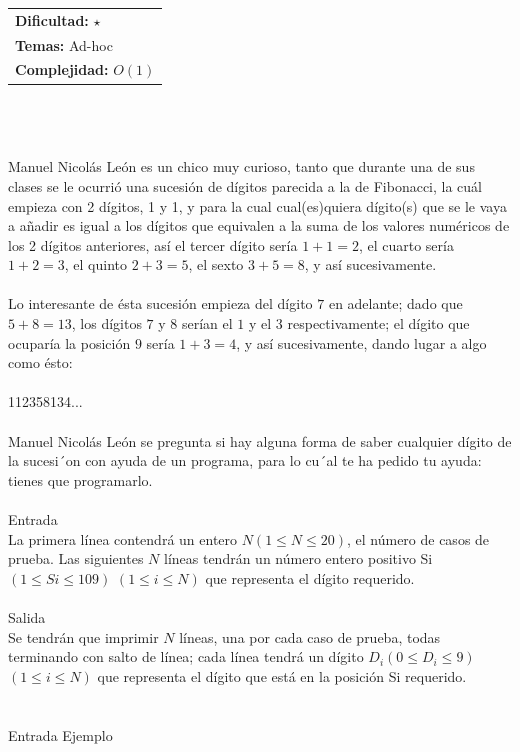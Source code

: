\documentclass[12pt]{article}
\begin{document}
\hfill
\begin{tabular}{@{}l@{}}
\textbf{Dificultad:} $\star$ \\
\textbf{Temas:} Ad-hoc \\
\textbf{Complejidad:} $O(1)$
\end{tabular}\\
\\
\\Manuel Nicolás León es un chico muy curioso, tanto que durante una de sus clases se le ocurrió una sucesión de dígitos parecida a la de Fibonacci, la cuál empieza con 2 dígitos, 1 y 1, y para la cual cual(es)quiera dígito(s) que se le vaya a añadir es igual a los dígitos que equivalen a la suma de los valores numéricos de los 2 dígitos anteriores,
así el tercer dígito sería $1+1=2$, el cuarto sería $1+2=3$, el quinto $2+3=5$, el sexto $3+5 = 8$, y así sucesivamente.\\
\\Lo interesante de ésta sucesión empieza del dígito $7$ en adelante; dado que $5+8 = 13$, los dígitos $7$ y $8$ serían el $1$ y el $3$ respectivamente; el dígito que ocuparía la posición $9$ sería $1+3=4$, y así sucesivamente, dando lugar a algo como ésto:\\
\\
\hspace{5 cm}\textrm{112358134...}
\\
\\Manuel Nicolás León se pregunta si hay alguna forma de saber cualquier dígito de la sucesi´on con ayuda de un
programa, para lo cu´al te ha pedido tu ayuda: tienes que programarlo.
\\
\\
\textrm{\large Entrada}
\\
La primera línea contendrá un entero $N (1 ≤ N ≤ 20)$, el número de casos de prueba. Las siguientes $N$ líneas tendrán un número entero positivo Si $(1 ≤ Si ≤ 109)$  $(1 ≤ i ≤ N)$ que representa el dígito requerido.
\\
\\
\textrm{\large Salida}
\\
Se tendrán que imprimir $N$ líneas, una por cada caso de prueba, todas terminando con salto de línea; cada línea tendrá un dígito $D_i (0 ≤ D_i ≤ 9)$  $(1 ≤ i ≤ N)$ que representa el dígito que está en la posición Si requerido.\\
\\
\\
\textrm{\large Entrada Ejemplo}
\\
\end{document}
